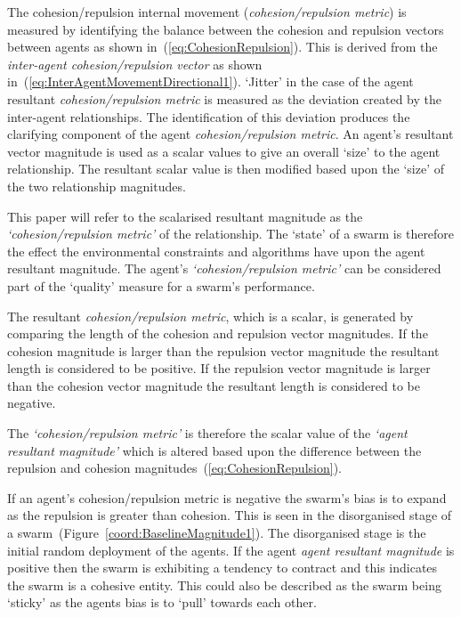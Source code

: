 \documentclass{ieeeaccess}
\begin{document}
The cohesion/repulsion internal movement (\emph{cohesion/repulsion metric}) is measured by identifying the balance between the cohesion and repulsion vectors between agents as shown in~(\ref{eq:CohesionRepulsion}). This is derived from the \emph{inter-agent cohesion/repulsion vector} as shown in~(\ref{eq:InterAgentMovementDirectional1}). `Jitter' in the case of the agent resultant \emph{cohesion/repulsion metric} is measured as the deviation created by the inter-agent relationships. The identification of this deviation produces the clarifying component of the agent \emph{cohesion/repulsion metric}.
An agent's resultant vector magnitude is used as a scalar values to give an overall `size' to the agent relationship. The resultant scalar value is then modified based upon the `size' of the two relationship magnitudes.

This paper will refer to the scalarised resultant magnitude as the \emph{`cohesion/repulsion metric'} of the relationship. The `state' of a swarm is therefore the effect the environmental constraints and algorithms have upon the agent resultant magnitude. The agent's \emph{`cohesion/repulsion metric'} can be considered part of the `quality' measure for a swarm's performance.

The resultant \emph{cohesion/repulsion metric}, which is a scalar, is generated by comparing the length of the cohesion and repulsion vector magnitudes. If the cohesion magnitude is larger than the repulsion vector magnitude the resultant length is considered to be positive. If the repulsion vector magnitude is larger than the cohesion vector magnitude the resultant length is considered to be negative. 

The \emph{`cohesion/repulsion metric'} is therefore the scalar value of the \emph{`agent resultant magnitude'} which is altered based upon the difference between the repulsion and cohesion magnitudes~(\ref{eq:CohesionRepulsion}).

If an agent's {cohesion/repulsion metric} is negative the swarm's bias is to expand as the repulsion is greater than cohesion. This is seen in the disorganised stage of a swarm~(Figure~\ref{coord:BaselineMagnitude1}). The disorganised stage is the initial random deployment of the agents. If the agent \emph{agent resultant magnitude} is positive then the swarm is exhibiting a tendency to contract and this indicates the swarm is a cohesive entity. This could also be described as the swarm being `sticky' as the agents bias is to `pull' towards each other.
\end{document}
